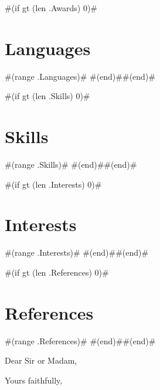 \documentclass[11pt,letterpaper,sans]{moderncv}        %
\begin{document}
#(if gt (len .Awards) 0)#\section{Languages}
#(range .Languages)#
#(end)##(end)#

#(if gt (len .Skills) 0)#\section{Skills}
#(range .Skills)#
#(end)##(end)#

#(if gt (len .Interests) 0)#\section{Interests}
#(range .Interests)#
#(end)##(end)#

#(if gt (len .References) 0)#\section{References}
#(range .References)#
#(end)##(end)#

\nocite{*}



\clearpage
\date{January 01, 1984}
\opening{Dear Sir or Madam,}
\closing{Yours faithfully,}
\makelettertitle
\end{document}
